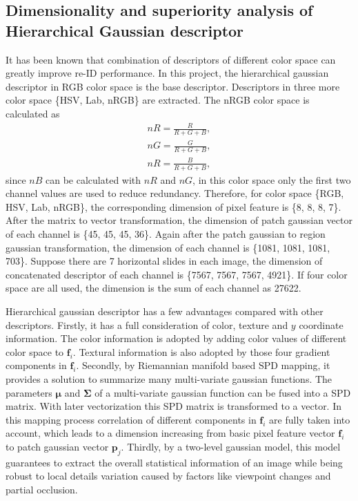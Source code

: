 \subsection{Dimensionality and superiority analysis of Hierarchical Gaussian descriptor}
It has been known that combination of descriptors of different color space can greatly improve re-ID performance. In this project, the hierarchical gaussian descriptor in RGB color space is the base descriptor. Descriptors in three more color space \{HSV, Lab, nRGB\} are extracted. The nRGB color space is calculated as 
\begin{equation}
\begin{aligned}
nR = \frac{R}{R+G+B},\\
nG = \frac{G}{R+G+B},\\
nR = \frac{B}{R+G+B}, 
\end{aligned}
\end{equation}
since $nB$ can be calculated with $nR$ and $nG$, in this color space only the first two channel values are used to reduce redundancy. Therefore, for color space \{RGB, HSV, Lab, nRGB\}, the corresponding dimension of pixel feature is \{8, 8, 8, 7\}. After the matrix to vector transformation, the dimension of patch gaussian vector of each channel is \{45, 45, 45, 36\}. Again after the patch gaussian to region gaussian transformation, the dimension of each channel is \{1081, 1081, 1081, 703\}. Suppose there are 7 horizontal slides in each image, the dimension of concatenated descriptor of each channel is \{7567, 7567, 7567, 4921\}. If four color space are all used, the dimension is the sum of each channel as 27622. 

Hierarchical gaussian descriptor has a few advantages compared with other descriptors. Firstly, it has a full consideration of color, texture and $y$ coordinate information. The color information is adopted by adding color values of different color space to $\bm{f}_i$. Textural information is also adopted by those four gradient components in $\bm{f}_i$. Secondly, by Riemannian manifold based SPD mapping, it provides a solution to summarize many multi-variate gaussian functions. The parameters $\bm{\mu}$ and $\bm{\Sigma}$ of a multi-variate gaussian function can be fused into a SPD matrix. With later vectorization this SPD matrix is transformed to a vector. In this mapping process correlation of different components in $\bm{f}_i$ are fully taken into account, which leads to a dimension increasing from basic pixel feature vector $\bm{f}_i$ to patch gaussian vector $\bm{p}_j$. Thirdly, by a two-level gaussian model, this model guarantees to extract the overall statistical information of an image while being robust to local details variation caused by factors like viewpoint changes and partial occlusion. 

